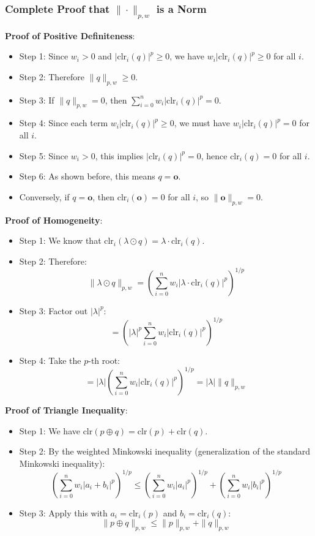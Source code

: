 \documentclass{amsart}
\theoremstyle{plain}
\theoremstyle{definition}
\theoremstyle{remark}
\begin{document}
\subsubsection{Complete Proof that \texorpdfstring{$\|\cdot\|_{p,w}$}{|cdot|_p,w} is a Norm}

\textbf{Proof of Positive Definiteness}:

\begin{itemize}
	\item Step 1: Since $w_i > 0$ and $|\text{clr}_i(q)|^p \geq 0$, we have $w_i|\text{clr}_i(q)|^p \geq 0$ for all $i$.
	\item Step 2: Therefore $\|q\|_{p,w} \geq 0$.
	\item Step 3: If $\|q\|_{p,w} = 0$, then $\sum_{i=0}^n w_i|\text{clr}_i(q)|^p = 0$.
	\item Step 4: Since each term $w_i|\text{clr}_i(q)|^p \geq 0$, we must have $w_i|\text{clr}_i(q)|^p = 0$ for all $i$.
	\item Step 5: Since $w_i > 0$, this implies $|\text{clr}_i(q)|^p = 0$, hence $\text{clr}_i(q) = 0$ for all $i$.
	\item Step 6: As shown before, this means $q = \mathbf{o}$.
	\item Conversely, if $q = \mathbf{o}$, then $\text{clr}_i(\mathbf{o}) = 0$ for all $i$, so $\|\mathbf{o}\|_{p,w} = 0$.
\end{itemize}

\textbf{Proof of Homogeneity}:

\begin{itemize}
	\item Step 1: We know that $\text{clr}_i(\lambda \odot q) = \lambda \cdot \text{clr}_i(q)$.
	\item Step 2: Therefore:
\[
\|\lambda \odot q\|_{p,w} = \left(\sum_{i=0}^n w_i |\lambda \cdot \text{clr}_i(q)|^p\right)^{1/p}
\]
	\item Step 3: Factor out $|\lambda|^p$:
\[
= \left(|\lambda|^p \sum_{i=0}^n w_i |\text{clr}_i(q)|^p\right)^{1/p}
\]
	\item Step 4: Take the $p$-th root:
\[
= |\lambda| \left(\sum_{i=0}^n w_i |\text{clr}_i(q)|^p\right)^{1/p} = |\lambda| \|q\|_{p,w}
\]
\end{itemize}

\textbf{Proof of Triangle Inequality}:

\begin{itemize}
	\item Step 1: We have $\text{clr}(p \oplus q) = \text{clr}(p) + \text{clr}(q)$.
	\item Step 2: By the weighted Minkowski inequality (generalization of the standard Minkowski inequality):
\[
\left(\sum_{i=0}^n w_i |a_i + b_i|^p\right)^{1/p} \leq \left(\sum_{i=0}^n w_i |a_i|^p\right)^{1/p} + \left(\sum_{i=0}^n w_i |b_i|^p\right)^{1/p}
\]
	\item Step 3: Apply this with $a_i = \text{clr}_i(p)$ and $b_i = \text{clr}_i(q)$:
\[
\|p \oplus q\|_{p,w} \leq \|p\|_{p,w} + \|q\|_{p,w}
\]
\end{itemize}
\end{document}
